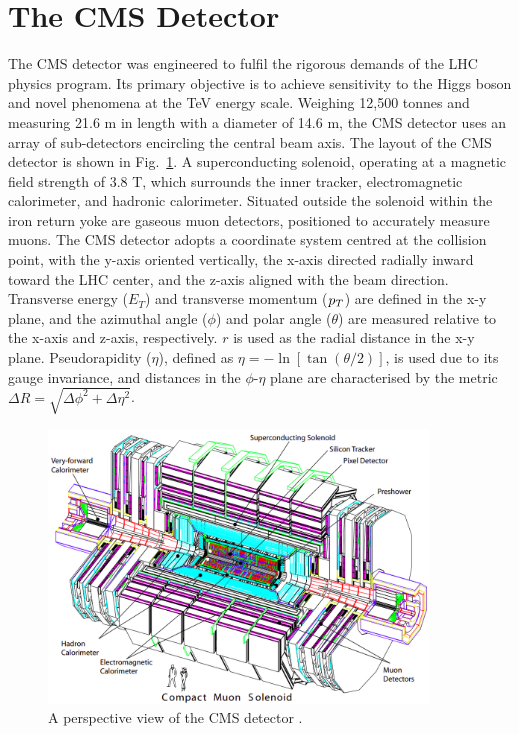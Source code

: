\section{The CMS Detector}

The \ac{CMS} detector was engineered to fulfil the rigorous demands of the \ac{LHC} physics program. 
Its primary objective is to achieve sensitivity to the Higgs boson and novel phenomena at the TeV energy scale. 
Weighing 12,500 tonnes and measuring 21.6 m in length with a diameter of 14.6 m, the \ac{CMS} detector uses an array of sub-detectors encircling the central beam axis. 
The layout of the \ac{CMS} detector is shown in Fig.~\ref{fig:CMS_Schematic}.
A superconducting solenoid, operating at a magnetic field strength of 3.8 T, which surrounds the inner tracker, electromagnetic calorimeter, and hadronic calorimeter. 
Situated outside the solenoid within the iron return yoke are gaseous muon detectors, positioned to accurately measure muons. 
The \ac{CMS} detector adopts a coordinate system centred at the collision point, with the y-axis oriented vertically, the x-axis directed radially inward toward the \ac{LHC} center, and the z-axis aligned with the beam direction. 
Transverse energy ($E_T$) and transverse momentum ($p_{T}$) are defined in the x-y plane, and the azimuthal angle ($\phi$) and polar angle ($\theta$) are measured relative to the x-axis and z-axis, respectively. 
$r$ is used as the radial distance in the x-y plane.
Pseudorapidity ($\eta$), defined as $\eta = -\ln[\tan(\theta/2)]$, is used due to its gauge invariance, and distances in the $\phi$-$\eta$ plane are characterised by the metric $\Delta R = \sqrt{\Delta\phi^2 + \Delta\eta^2}$. 

\begin{figure}[h]
    \centering
    \includegraphics[width=0.9\textwidth]{Figures/CMS_Detector.png}
    \caption{A perspective view of the \ac{CMS} detector \cite{CMS_Setup}.}
    \label{fig:CMS_Schematic}
\end{figure}

